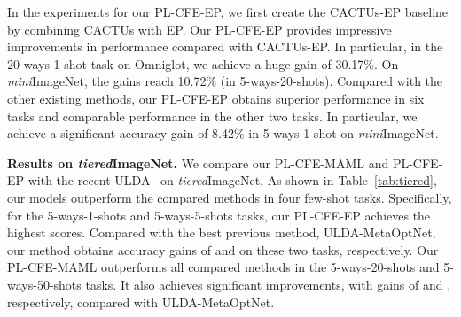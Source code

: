 \documentclass[runningheads]{llncs}
\def\ourmodel{PL-CFE}
\begin{document}
In the experiments for our \ourmodel-EP, we first create the CACTUs-EP baseline by combining CACTUs with EP. Our \ourmodel-EP provides impressive improvements in performance compared with CACTUs-EP. In particular, in the 20-ways-1-shot task on Omniglot, we achieve a huge gain of 30.17\%. On \textit{mini}ImageNet, the gains reach 10.72\% (in 5-ways-20-shots). Compared with the other existing methods, our \ourmodel-EP obtains superior performance in six tasks and comparable performance in the other two tasks. In particular, we achieve a significant accuracy gain of 8.42\% in 5-ways-1-shot on \textit{mini}ImageNet.   









\begin{table}[!tb]
\caption{\textbf{Accuracy (\%) of N-ways-K-shots (N,K) tasks on \textit{tiered}ImageNet~\cite{ren2018meta}.} We show the results of supervised methods MAML~\cite{hsu2018unsupervised} and EP~\cite{rodriguez2020embedding} for complete comparison. The best values are in bold.
\vspace{-2mm}
}
\vspace{-2mm}
\label{tab:tiered}
\end{table}

\noindent\textbf{Results on \textit{tiered}ImageNet.} 
We compare our \ourmodel-MAML and \ourmodel-EP with the recent ULDA~\cite{qin2020unsupervised} on \textit{tiered}ImageNet. As shown in Table~\ref{tab:tiered}, our models outperform the compared methods in four few-shot tasks. Specifically, for the 5-ways-1-shots and 5-ways-5-shots tasks, our \ourmodel-EP achieves the highest scores. Compared with the best previous method, ULDA-MetaOptNet, our method obtains accuracy gains of  and  on these two tasks, respectively. Our \ourmodel-MAML outperforms all compared methods in the 5-ways-20-shots and 5-ways-50-shots tasks. It also achieves significant improvements, with gains of  and , respectively, compared with ULDA-MetaOptNet. 
\end{document}
